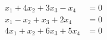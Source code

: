 \begin{align*}
x_1 + 4x_2 + 3x_3 - x_4 &= 0\\
x_1 - x_2 + x_3 + 2x_4 &= 0\\
4x_1 + x_2 + 6x_3 + 5x_4 &= 0
\end{align*}